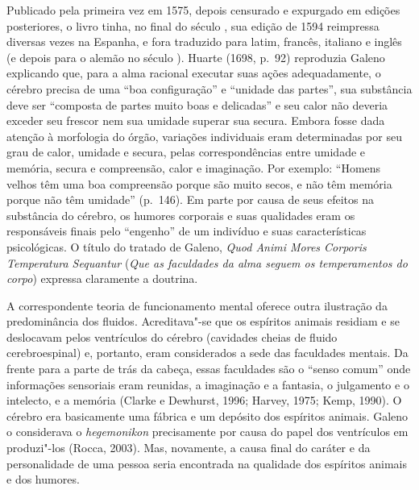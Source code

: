 Publicado pela primeira vez em 1575, depois censurado e expurgado em
edições posteriores, o livro tinha, no final do século , sua edição
de 1594 reimpressa diversas vezes na Espanha, e fora traduzido para
latim, francês, italiano e inglês (e depois para o alemão no século
). Huarte (1698, p.~92) reproduzia Galeno explicando que, para a
alma racional executar suas ações adequadamente, o cérebro precisa de uma
``boa configuração'' e ``unidade das partes'', sua substância deve ser
``composta de partes muito boas e delicadas'' e seu calor não deveria
exceder seu frescor nem sua umidade superar sua secura. Embora fosse dada
atenção à morfologia do órgão, variações individuais eram determinadas
por seu grau de calor, umidade e secura, pelas correspondências entre
umidade e memória, secura e compreensão, calor e imaginação. Por
exemplo: ``Homens velhos têm uma boa compreensão porque são muito secos,
e não têm memória porque não têm umidade'' (p.~146). Em parte por causa
de seus efeitos na substância do cérebro, os humores corporais e suas
qualidades eram os responsáveis finais pelo ``engenho'' de um
indivíduo e suas características psicológicas. O título do tratado de
Galeno, \emph{Quod Animi Mores Corporis Temperatura Sequantur} (\emph{Que
as faculdades da alma seguem os temperamentos do corpo}) expressa claramente
a doutrina.

A correspondente teoria de funcionamento mental oferece outra ilustração
da predominância dos fluidos. Acreditava"-se que os espíritos animais
residiam e se deslocavam pelos ventrículos do cérebro (cavidades cheias
de fluido cerebroespinal) e, portanto, eram considerados a sede das
faculdades mentais. Da frente para a parte de trás da cabeça, essas
faculdades são o ``senso comum'' onde informações sensoriais eram
reunidas, a imaginação e a fantasia, o julgamento e o intelecto, e a
memória (Clarke e Dewhurst, 1996; Harvey, 1975; Kemp, 1990). O cérebro
era basicamente uma fábrica e um depósito dos espíritos animais. Galeno
o considerava o \emph{hegemonikon} precisamente por causa do papel dos
ventrículos em produzi"-los (Rocca, 2003). Mas, novamente, a causa final
do caráter e da personalidade de uma pessoa seria encontrada na
qualidade dos espíritos animais e dos humores.

